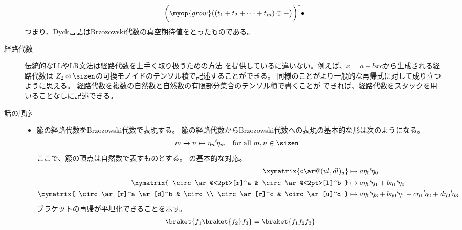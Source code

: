 \begin{todo}[ここまで]
\begin{description}
			\begin{equation*}\begin{split} %
				\biggl(\myop{grow}\bigl((t_1 + t_2 + \cdots + t_m)\otimes-\bigr)
					\biggr)^*\bullet
			\end{split}\end{equation*} %
			つまり、Dyck言語はBrzozowski代数の真空期待値をとったものである。
			\item[経路代数] 伝統的なLLやLR文法は経路代数を上手く取り扱うための方法
			を提供しているに違いない。例えば、$x=a+bxc$から生成される経路代数は
			$Z_2\otimes\sizen$の可換モノイドのテンソル積で記述することができる。
			同様のことがより一般的な再帰式に対して成り立つように思える。
			経路代数を複数の自然数と自然数の有限部分集合のテンソル積で書くことが
			できれば、経路代数をスタックを用いることなしに記述できる。
			\item[話の順序] 
			\begin{itemize}\setlength{\itemsep}{-1mm} %
				\item 箙の経路代数をBrzozowski代数で表現する。
				箙の経路代数からBrzozowski代数への表現の基本的な形は次のようになる。
				\begin{equation*}\begin{split} %
					m \xrightarrow{} n &\mapsto \eta_n\lu{t}\eta_m
					\quad\text{for all }m,n\in\sizen
				\end{split}\end{equation*} %
				ここで、箙の頂点は自然数で表すものとする。
				の基本的な対応。
				\begin{equation*}\begin{split} %
					\xymatrix{
						\circ \ar@(ul,dl)_a
					} &\mapsto a\eta_0\lu{t}{\eta_0} \\
					\xymatrix{
						\circ \ar@<2pt>[r]^a & \circ \ar@<2pt>[l]^b
					} &\mapsto a\eta_0\lu{t}{\eta_1} + b\eta_1\lu{t}{\eta_0} \\
					\xymatrix{
						\circ \ar[r]^a \ar[d]^b & \circ \\
						\circ \ar[r]^c & \circ \ar[u]^d
					} &\mapsto a\eta_0\lu{t}{\eta_3} + b\eta_0\lu{t}{\eta_1}
						+ c\eta_1\lu{t}{\eta_2} + d\eta_2\lu{t}{\eta_3} \\
				\end{split}\end{equation*} %
				ブラケットの再帰が平坦化できることを示す。
				\begin{equation*}\begin{split} %
					\braket{f_1\braket{f_2}f_3} = \braket{f_1f_2f_3}
				\end{split}\end{equation*} %

\end{itemize}
\end{description}
\end{todo}
